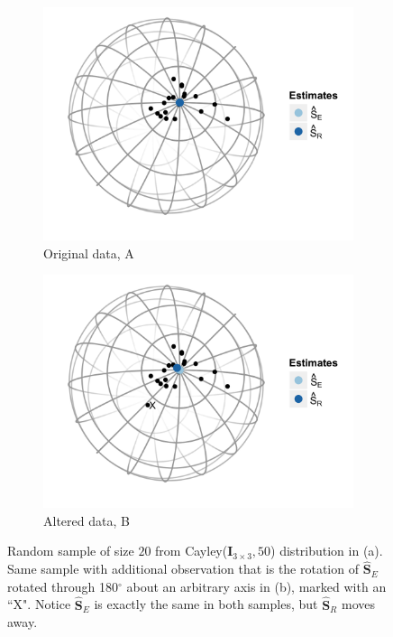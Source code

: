 \documentclass{article}\usepackage{graphicx, color}
\newcommand{\ProjMean}{{\widehat{\bm S}_{E}}}
\newcommand{\GeomMean}{{\widehat{\bm S}_{R}}}
\begin{document}
\begin{figure}
\centering
\begin{subfigure}[b]{0.45\textwidth}
  \centering
  \includegraphics[width=\textwidth]{Figure/Sample1}
  \caption{Original data, A}
  \label{fig:samp1}
\end{subfigure}
\begin{subfigure}[b]{0.45\textwidth}
  \centering
  \includegraphics[width=\textwidth]{Figure/Sample2}
  \caption{Altered data, B}
  \label{fig:samp2}
\end{subfigure}
\caption{Random sample of size $20$ from Cayley($\bm I_{3\times 3},50$) distribution in (a).  Same sample with additional observation that is the rotation of $\ProjMean$ rotated through 180$^\circ$ about an arbitrary axis in (b), marked with an ``X".  Notice $\ProjMean$ is exactly the same in both samples, but $\GeomMean$ moves away.}
\label{fig:sample}
\end{figure}
\clearpage
\end{document}

